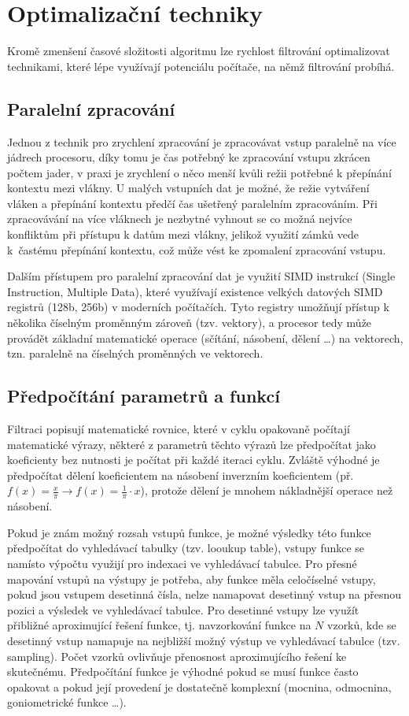 \section{Optimalizační techniky}
\label{sec:design:optimalization}
Kromě zmenšení časové složitosti algoritmu lze rychlost filtrování optimalizovat technikami, které lépe využívají potenciálu počítače, na němž filtrování probíhá.

\subsection*{Paralelní zpracování}
Jednou z technik pro zrychlení zpracování je zpracovávat vstup paralelně na více jádrech procesoru, díky tomu je čas potřebný ke zpracování vstupu zkrácen počtem jader, v praxi je zrychlení o něco menší kvůli režii potřebné k přepínání kontextu mezi vlákny. U malých vstupních dat je možné, že režie vytváření vláken a přepínání kontextu předčí čas ušetřený paralelním zpracováním. Při zpracovávání na více vláknech je nezbytné vyhnout se co možná nejvíce konfliktům při přístupu k datům mezi vlákny, jelikož využití zámků vede k~častému přepínání kontextu, což může vést ke zpomalení zpracování vstupu.

Dalším přístupem pro paralelní zpracování dat je využití SIMD instrukcí (Single Instruction, Multiple Data), které využívají existence velkých datových SIMD registrů (128b, 256b) v moderních počítačích. Tyto registry umožňují přístup k několika číselným proměnným zároveň (tzv. vektory), a procesor tedy může provádět základní matematické operace (sčítání, násobení, dělení \dots) na vektorech, tzn. paralelně na číselných proměnných ve vektorech. 

\subsection*{Předpočítání parametrů a funkcí}
Filtraci popisují matematické rovnice, které v cyklu opakovaně počítají matematické výrazy, některé z parametrů těchto výrazů lze předpočítat jako koeficienty bez nutnosti je počítat při každé iteraci cyklu. Zvláště výhodné je předpočítat dělení koeficientem na násobení inverzním koeficientem (př. $f(x)=\frac{x}{\pi} \rightarrow f(x)=\frac{1}{\pi} \cdot x$), protože dělení je mnohem nákladnější operace než násobení. 

Pokud je znám možný rozsah vstupů funkce, je možné výsledky této funkce předpočítat do vyhledávací tabulky (tzv. looukup table), vstupy funkce se namísto výpočtu využijí pro indexaci ve vyhledávací tabulce. Pro přesné mapování vstupů na výstupy je potřeba, aby funkce měla celočíselné vstupy, pokud jsou vstupem desetinná čísla, nelze namapovat desetinný vstup na přesnou pozici a výsledek ve vyhledávací tabulce. Pro desetinné vstupy lze využít přibližné aproximující řešení funkce, tj. navzorkování funkce na $N$ vzorků, kde se desetinný vstup namapuje na nejbližší možný výstup ve vyhledávací tabulce (tzv. sampling). Počet vzorků ovlivňuje přenosnost aproximujícího řešení ke skutečnému. Předpočítání funkce je výhodné pokud se musí funkce často opakovat a pokud její provedení je dostatečně komplexní (mocnina, odmocnina, goniometrické funkce \dots).

